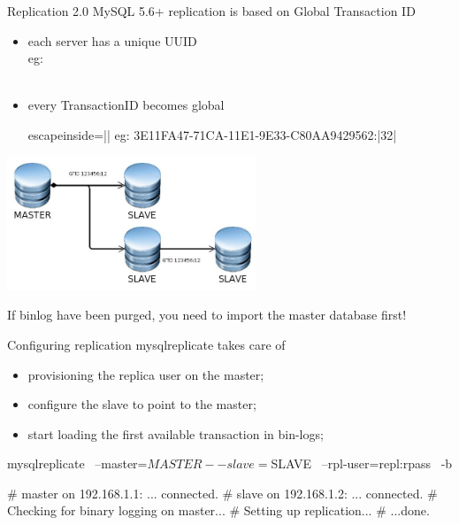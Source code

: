 \documentclass{beamer}[10]
\begin{document}
\begin{pyframe}{Replication 2.0}
MySQL 5.6+ replication is based on Global Transaction ID
\begin{itemize}
\item each server has a unique UUID \\
eg: 
\\ \\
\item every TransactionID becomes global\\
\begin{pycode*}{escapeinside=||}
eg: 3E11FA47-71CA-11E1-9E33-C80AA9429562:|32|
\end{pycode*}
\end{itemize}
\includegraphics[height=4cm]{images/mysql-propagate-gtid.jpg}

{\large
    If binlog have been purged, you need to import the
master database first!
}

\end{pyframe}



\begin{pyframe}{Configuring replication}
mysqlreplicate takes care of
\begin{itemize}
\item provisioning the replica user on the master;
\item configure the slave to point to the master;
\item start loading the first available transaction in bin-logs;
\end{itemize}

\begin{bashcode}
mysqlreplicate \
 --master=$MASTER --slave=$SLAVE \
 --rpl-user=repl:rpass \
 -b

# master on 192.168.1.1: ... connected.
# slave on 192.168.1.2: ... connected.
# Checking for binary logging on master...
# Setting up replication...
# ...done.
\end{bashcode}
\end{pyframe}
\end{document}
